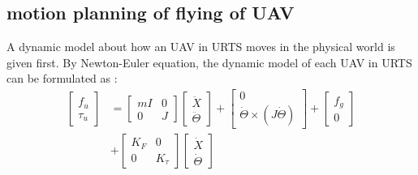 \documentclass{ieeeaccess}
\begin{document}
\subsection{motion planning of flying of UAV}
A dynamic model about how an UAV in URTS moves in the physical world is given first. By Newton-Euler equation, the dynamic model of each UAV in URTS can be formulated as \cite{sabatino2015quadrotor}:
\begin{equation} \label{eq:uav} 
    \begin{split}
        \begin{bmatrix}
            f_u \\ \tau_u
        \end{bmatrix}&=\begin{bmatrix}
            mI & 0 \\ 0 & J
        \end{bmatrix}\begin{bmatrix}
            \ddot{X} \\ \ddot{\Theta}
        \end{bmatrix}+\begin{bmatrix}
            0 \\ \dot{\Theta}\times(J\dot{\Theta})
        \end{bmatrix}+\begin{bmatrix}
            f_g \\ 0
        \end{bmatrix}
        \\
        &+\begin{bmatrix}
            K_F & 0 \\
            0 & K_\tau
        \end{bmatrix}\begin{bmatrix}
            \dot{X} \\ \dot{\Theta}
        \end{bmatrix}
    \end{split}
\end{equation}
\end{document}
